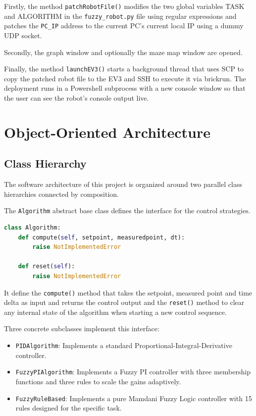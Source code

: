 Firstly, the method \texttt{patchRobotFile()} modifies the two global variables TASK and ALGORITHM in the \texttt{fuzzy\_robot.py} file using regular expressions and patches the \texttt{PC\_IP} address to the current PC's current local IP using a dummy UDP socket.

Secondly, the graph window and optionally the maze map window are opened. 

Finally, the method \texttt{launchEV3()} starts a background thread that uses SCP to copy the patched robot file to the EV3 and SSH to execute it via brickrun. The deployment runs in a Powershell subprocess with a new console window so that the user can see the robot's console output live.

\section{Object-Oriented Architecture}
\label{sec:oop}

\subsection{Class Hierarchy}
\label{sec:class-hierarchy}

The software architecture of this project is organized around two parallel class hierarchies connected by composition. 

The \texttt{Algorithm} abstract base class defines the interface for the control strategies. 

\begin{lstlisting}[language=Python, caption={Algorithm Base Class}, label={lst:algorithm-base}]
class Algorithm:
    def compute(self, setpoint, measuredpoint, dt):
        raise NotImplementedError
    
    def reset(self):
        raise NotImplementedError
\end{lstlisting}

It define the \texttt{compute()} method that takes the setpoint, measured point and time delta as input and returns the control output and the \texttt{reset()} method to clear any internal state of the algorithm when starting a new control sequence.

Three concrete subclasses implement this interface:
\begin{itemize}
    \item \texttt{PIDAlgorithm}: Implements a standard Proportional-Integral-Derivative controller.
    \item \texttt{FuzzyPIAlgorithm}: Implements a Fuzzy PI controller with three membership functions and three rules to scale the gains adaptively.
    \item \texttt{FuzzyRuleBased}: Implements a pure Mamdani Fuzzy Logic controller with 15 rules designed for the specific task.
\end{itemize}

